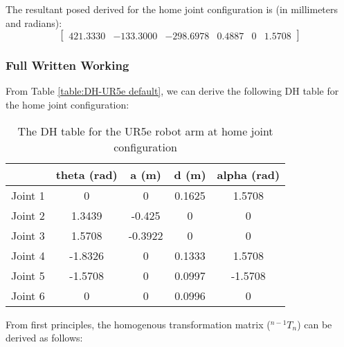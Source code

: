 The resultant posed derived for the home joint configuration is (in millimeters and radians):
\begin{equation*}
    \begin{bmatrix}
        421.3330 & -133.3000 & -298.6978 & 0.4887 & 0 & 1.5708
    \end{bmatrix}
\end{equation*}
\subsubsection{Full Written Working}

From Table \ref{table:DH-UR5e default}, we can derive the following DH table for the home joint configuration:

\begin{table}[H]
    \centering
    \begin{tabular}{|c|c|c|c|c|}
        \hline
                & \textbf{theta (rad)} & \textbf{a (m)} & \textbf{d (m)} & \textbf{alpha (rad)} \\ \hline
        Joint 1 & 0                    & 0              & 0.1625         & 1.5708               \\ \hline
        Joint 2 & 1.3439               & -0.425         & 0              & 0                    \\ \hline
        Joint 3 & 1.5708               & -0.3922        & 0              & 0                    \\ \hline
        Joint 4 & -1.8326              & 0              & 0.1333         & 1.5708               \\ \hline
        Joint 5 & -1.5708              & 0              & 0.0997         & -1.5708              \\ \hline
        Joint 6 & 0                    & 0              & 0.0996         & 0                    \\ \hline
    \end{tabular}
    \caption{The DH table for the UR5e robot arm at home joint configuration}
    \label{table:DH-UR5e home}
\end{table}


From first principles, the homogenous transformation matrix ($^{n-1}T_{n}$) can be derived as follows:

